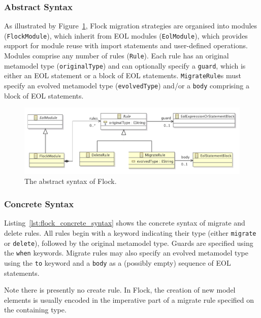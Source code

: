\subsubsection{Abstract Syntax}
\label{subsubsec:abstract_syntax}
As illustrated by Figure~\ref{fig:abstract_syntax}, Flock migration strategies are organised into modules (\texttt{Fl\-ockMo\-du\-le}), which inherit from EOL modules (\texttt{Eo\-lMod\-ule}), which provides support for module reuse with import statements and user-defined operations. Modules comprise any number of rules (\texttt{Ru\-le}). Each rule has an original metamodel type (\texttt{or\-ig\-in\-alTy\-pe}) and can optionally specify a \texttt{gu\-ard}, which is either an EOL statement or a block of EOL statements. \texttt{Mi\-gr\-ateRu\-le}s must specify an evolved metamodel type (\texttt{ev\-ol\-vedTy\-pe}) and/or a \texttt{bo\-dy} comprising a block of EOL statements.

\begin{figure}
  \centering
  \includegraphics[scale=0.75]{5.Implementation/flock_abstract_syntax.pdf}
  \caption{The abstract syntax of Flock.}
  \label{fig:abstract_syntax}
\end{figure}

\subsubsection{Concrete Syntax}
\label{subsubsec:concrete_syntax}

Listing~\ref{lst:flock_concrete_syntax} shows the concrete syntax of migrate and delete rules. All rules begin with a keyword indicating their type (either \texttt{migrate} or \texttt{delete}), followed by the original metamodel type. Guards are specified using the \texttt{when} keywords. Migrate rules may also specify an evolved metamodel type using the \texttt{to} keyword and a \texttt{body} as a (possibly empty) sequence of EOL statements.

Note there is presently no create rule. In Flock, the creation of new model elements is usually encoded in the imperative part of a migrate rule specified on the containing type.

